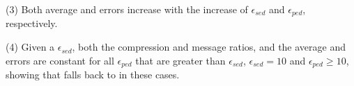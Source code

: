 {%

\ni (3) Both average \ped and \sed errors increase with the increase of $\epsilon_{sed}$ and $\epsilon_{ped}$, respectively.

\ni (4) Given a $\epsilon_{sed}$, both the compression and message ratios, and the average \sed and \ped errors are constant for all $\epsilon_{ped}$ that are greater than $\epsilon_{sed}$, \eg $\epsilon_{sed}=10$ and $\epsilon_{ped} \ge 10$, showing that \bitt falls back to \citt in these cases.


}
